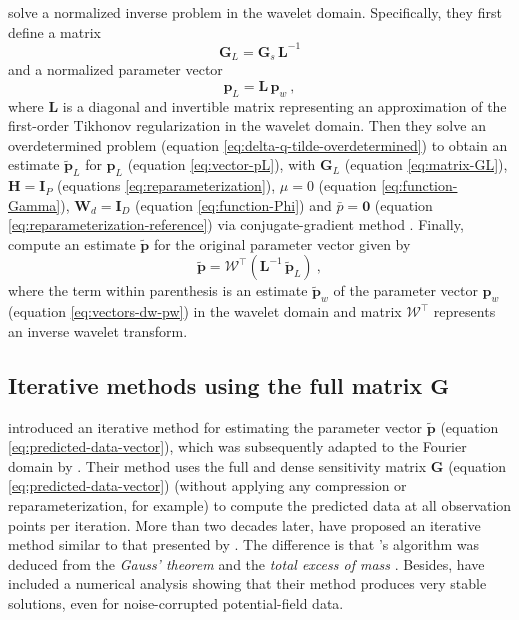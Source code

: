 \citet{li-oldenburg_2010} solve a normalized inverse problem in the wavelet domain.
Specifically, they first define a matrix
\begin{equation}
	\mathbf{G}_{L} = \mathbf{G}_{s} \, \mathbf{L}^{-1}
	\label{eq:matrix-GL}
\end{equation}
and a normalized parameter vector 
\begin{equation}
	\mathbf{p}_{L} = \mathbf{L} \, \mathbf{p}_{w} \: ,
	\label{eq:vector-pL}
\end{equation}
where $\mathbf{L}$ is a diagonal and invertible matrix representing an approximation of the 
first-order Tikhonov regularization in the wavelet domain.
Then they solve an overdetermined problem (equation \ref{eq:delta-q-tilde-overdetermined}) 
to obtain an estimate $\tilde{\mathbf{p}}_{L}$ for $\mathbf{p}_{L}$ (equation \ref{eq:vector-pL}), 
with $\mathbf{G}_{L}$ (equation \ref{eq:matrix-GL}), 
$\mathbf{H} = \mathbf{I}_{P}$ (equations \ref{eq:reparameterization}),
$\mu = 0$ (equation \ref{eq:function-Gamma}), 
$\mathbf{W}_{d} = \mathbf{I}_{D}$ (equation \ref{eq:function-Phi}) and 
$\bar{p} = \mathbf{0}$ (equation \ref{eq:reparameterization-reference}) via 
conjugate-gradient method \cite[e.g.,][sec. 11.3]{golub-vanloan2013}.
Finally, \citet{li-oldenburg_2010} compute an estimate $\tilde{\mathbf{p}}$ for the original parameter vector given by
\begin{equation}
	\tilde{\mathbf{p}} = \boldsymbol{\mathcal{W}}^{\top} \left( \mathbf{L}^{-1} \, \tilde{\mathbf{p}}_{L} \right) \: ,
	\label{eq:vector-p-tilde-LO10}
\end{equation}
where the term within parenthesis is an estimate $\tilde{\mathbf{p}}_{w}$ of the parameter vector $\mathbf{p}_{w}$
(equation \ref{eq:vectors-dw-pw}) in the wavelet domain and 
matrix $\boldsymbol{\mathcal{W}}^{\top}$ represents an inverse wavelet transform. 

\subsection{Iterative methods using the full matrix $\mathbf{G}$}

\citet{xia-sprowl1991} introduced an iterative method for estimating the parameter vector $\tilde{\mathbf{p}}$ 
(equation \ref{eq:predicted-data-vector}), which was subsequently adapted to the Fourier domain by \citet{xia-etal1993}.
Their method uses the full and dense sensitivity matrix $\mathbf{G}$ (equation \ref{eq:predicted-data-vector})
(without applying any compression or reparameterization, for example) to compute the predicted data
at all observation points per iteration.
More than two decades later, \cite{siqueira-etal2017} have proposed an iterative method similar to that presented by \citet{xia-sprowl1991}.
The difference is that \citeauthor{siqueira-etal2017}'s algorithm was deduced from 
the \textit{Gauss' theorem} \cite[e.g.,][p. 43]{kellogg1967} and the \textit{total excess of mass} \cite[e.g.,][p. 60]{blakely1996}.
Besides, \citet{siqueira-etal2017} have included a numerical analysis showing that their method produces very stable solutions, 
even for noise-corrupted potential-field data.

